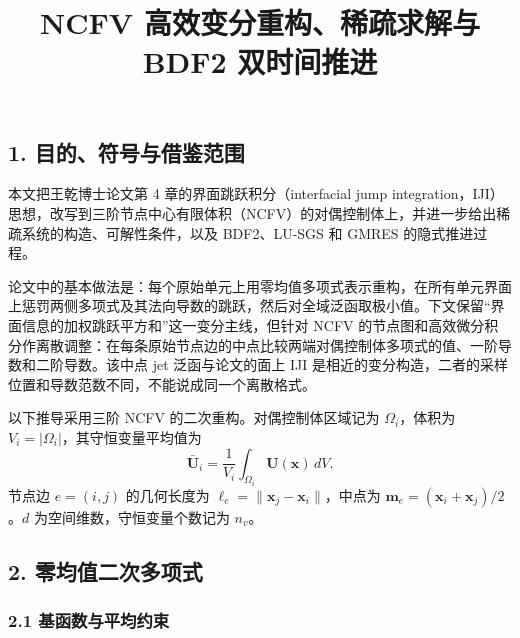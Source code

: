 \documentclass[
  12pt,
  UTF8]{ctexart}
\title{\zihao{-3} NCFV 高效变分重构、稀疏求解与 BDF2 双时间推进}
\author{}
\date{}
\begin{document}
\maketitle

\hypertarget{ux76eeux7684ux7b26ux53f7ux4e0eux501fux9274ux8303ux56f4}{%
\subsection{1.
目的、符号与借鉴范围}\label{ux76eeux7684ux7b26ux53f7ux4e0eux501fux9274ux8303ux56f4}}

本文把王乾博士论文第 4 章的界面跳跃积分（interfacial jump
integration，IJI）思想，改写到三阶节点中心有限体积（NCFV）的对偶控制体上，并进一步给出稀疏系统的构造、可解性条件，以及
BDF2、LU-SGS 和 GMRES 的隐式推进过程。

论文中的基本做法是：每个原始单元上用零均值多项式表示重构，在所有单元界面上惩罚两侧多项式及其法向导数的跳跃，然后对全域泛函取极小值。下文保留``界面信息的加权跳跃平方和''这一变分主线，但针对
NCFV
的节点图和高效微分积分作离散调整：在每条原始节点边的中点比较两端对偶控制体多项式的值、一阶导数和二阶导数。该中点
jet 泛函与论文的面上 IJI
是相近的变分构造，二者的采样位置和导数范数不同，不能说成同一个离散格式。

以下推导采用三阶 NCFV 的二次重构。对偶控制体区域记为
\(\Omega_i\)，体积为 \(V_i=|\Omega_i|\)，其守恒变量平均值为 \begin{equation}
\bar{\boldsymbol U}_i=\frac{1}{V_i}\int_{\Omega_i}\boldsymbol U(\boldsymbol x)\,dV.\end{equation} 节点边 \(e=(i,j)\) 的几何长度为
\(\ell_e=\|\boldsymbol x_j-\boldsymbol x_i\|\)，中点为
\(\boldsymbol m_e=(\boldsymbol x_i+\boldsymbol x_j)/2\)。\(d\)
为空间维数，守恒变量个数记为 \(n_v\)。

\hypertarget{ux96f6ux5747ux503cux4e8cux6b21ux591aux9879ux5f0f}{%
\subsection{2.
零均值二次多项式}\label{ux96f6ux5747ux503cux4e8cux6b21ux591aux9879ux5f0f}}

\hypertarget{ux57faux51fdux6570ux4e0eux5e73ux5747ux7ea6ux675f}{%
\subsubsection{2.1
基函数与平均约束}\label{ux57faux51fdux6570ux4e0eux5e73ux5747ux7ea6ux675f}}
\end{document}
